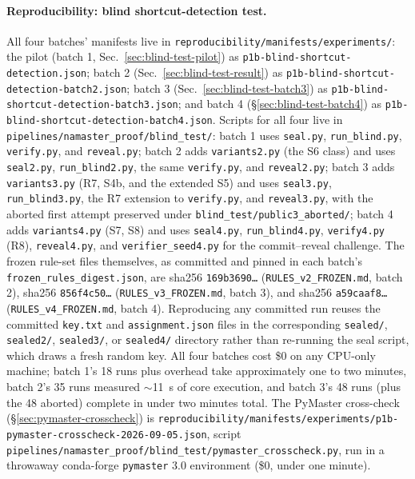 \documentclass[11pt]{article}
\begin{document}
\begin{sloppypar}
\paragraph{Reproducibility: blind shortcut-detection test.} All four batches'
manifests live in \nolinkurl{reproducibility/manifests/experiments/}: the
pilot (batch 1, Sec.~\ref{sec:blind-test-pilot}) as
\nolinkurl{p1b-blind-shortcut-detection.json}; batch 2
(Sec.~\ref{sec:blind-test-result}) as
\nolinkurl{p1b-blind-shortcut-detection-batch2.json}; batch 3
(Sec.~\ref{sec:blind-test-batch3}) as
\nolinkurl{p1b-blind-shortcut-detection-batch3.json}; and batch 4
(\S\ref{sec:blind-test-batch4}) as
\nolinkurl{p1b-blind-shortcut-detection-batch4.json}. Scripts for all four
live in \nolinkurl{pipelines/namaster_proof/blind_test/}: batch 1 uses
\texttt{seal.py}, \texttt{run\_blind.py}, \texttt{verify.py}, and
\texttt{reveal.py}; batch 2 adds \texttt{variants2.py} (the S6 class) and
uses \texttt{seal2.py}, \texttt{run\_blind2.py}, the same \texttt{verify.py},
and \texttt{reveal2.py}; batch 3 adds \texttt{variants3.py} (R7, S4b, and the
extended S5) and uses \texttt{seal3.py}, \texttt{run\_blind3.py}, the R7
extension to \texttt{verify.py}, and \texttt{reveal3.py}, with the aborted
first attempt preserved under \nolinkurl{blind_test/public3_aborted/}; batch
4 adds \texttt{variants4.py} (S7, S8) and uses \texttt{seal4.py},
\texttt{run\_blind4.py}, \texttt{verify4.py} (R8), \texttt{reveal4.py}, and
\texttt{verifier\_seed4.py} for the commit--reveal challenge. The frozen
rule-set files themselves, as committed and pinned in each batch's
\texttt{frozen\_rules\_digest.json}, are sha256
\texttt{169b3690\ldots} (\nolinkurl{RULES_v2_FROZEN.md}, batch 2), sha256
\texttt{856f4c50\ldots} (\nolinkurl{RULES_v3_FROZEN.md}, batch 3), and sha256
\texttt{a59caaf8\ldots} (\nolinkurl{RULES_v4_FROZEN.md}, batch 4).
Reproducing any committed run reuses the committed \texttt{key.txt} and
\texttt{assignment.json} files in the corresponding \texttt{sealed/},
\texttt{sealed2/}, \texttt{sealed3/}, or \texttt{sealed4/} directory rather
than re-running the seal script, which draws a fresh random key. All four batches cost \$0 on any
CPU-only machine; batch 1's 18 runs plus overhead take approximately one to
two minutes, batch 2's 35 runs measured \(\sim\)11~s of core execution, and
batch 3's 48 runs (plus the 48 aborted) complete in under two minutes total.
The PyMaster cross-check (\S\ref{sec:pymaster-crosscheck}) is
\nolinkurl{reproducibility/manifests/experiments/p1b-pymaster-crosscheck-2026-09-05.json},
script \nolinkurl{pipelines/namaster_proof/blind_test/pymaster_crosscheck.py},
run in a throwaway conda-forge \texttt{pymaster} 3.0 environment (\$0,
under one minute).
\end{sloppypar}
\end{document}
